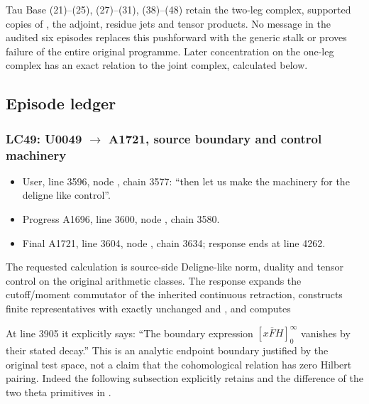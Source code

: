 
Tau Base (21)--(25), (27)--(31), (38)--(48) retain the two-leg complex,
supported copies of \protect{}, the adjoint, residue jets and
tensor products. No message in the audited six episodes replaces this
pushforward with the generic stalk or proves failure of the entire
original programme. Later concentration on the one-leg complex has an
exact relation to the joint complex, calculated below.

\subsection{Episode ledger}\label{TranscriptLedgerStage:episode-ledger}

\subsubsection{\texorpdfstring{LC49: U0049
\allowbreak{}\ensuremath{→}\allowbreak{} A1721, source boundary and
control
machinery}{LC49: U0049  A1721, source boundary and control machinery}}\label{TranscriptLedgerStage:lc49-u0049-a1721-source-boundary-and-control-machinery}

\begin{itemize}
\tightlist
\item
  User, line 3596, node
  \protect{}, chain 3577:
  ``then let us make the machinery for the deligne like control''.
\item
  Progress A1696, line 3600, node
  \protect{}, chain 3580.
\item
  Final A1721, line 3604, node
  \protect{}, chain 3634;
  response ends at line 4262.
\end{itemize}

The requested calculation is source-side Deligne-like norm, duality and
tensor control on the original arithmetic classes. The response expands
the cutoff/moment commutator of the inherited continuous retraction,
constructs finite representatives \protect{} with
exactly unchanged \protect{} and \protect{},
and computes


At line 3905 it explicitly says: ``The boundary expression
\([x\overline F H]_0^\infty\) vanishes by their stated decay.'' This is
an analytic endpoint boundary justified by the original test space, not
a claim that the cohomological relation \protect{} has zero
Hilbert pairing. Indeed the following subsection explicitly retains
\protect{} and the difference of the two theta primitives in
\protect{}.

